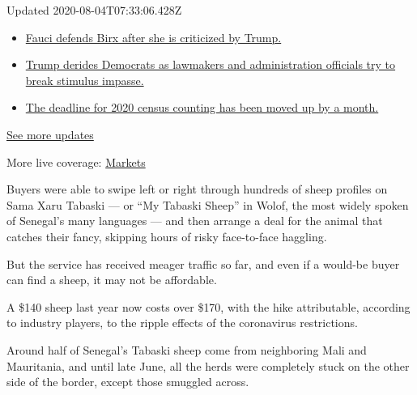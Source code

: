 Updated 2020-08-04T07:33:06.428Z

\begin{itemize}
\tightlist
\item
  \href{https://www.nytimes.com/2020/08/03/world/coronavirus-covid-19.html?action=click\&pgtype=Article\&state=default\&region=MAIN_CONTENT_1\&context=storylines_live_updates\#link-4547638f}{Fauci
  defends Birx after she is criticized by Trump.}
\item
  \href{https://www.nytimes.com/2020/08/03/world/coronavirus-covid-19.html?action=click\&pgtype=Article\&state=default\&region=MAIN_CONTENT_1\&context=storylines_live_updates\#link-15e7f995}{Trump
  derides Democrats as lawmakers and administration officials try to
  break stimulus impasse.}
\item
  \href{https://www.nytimes.com/2020/08/03/world/coronavirus-covid-19.html?action=click\&pgtype=Article\&state=default\&region=MAIN_CONTENT_1\&context=storylines_live_updates\#link-e5a2cda}{The
  deadline for 2020 census counting has been moved up by a month.}
\end{itemize}

\href{https://www.nytimes.com/2020/08/03/world/coronavirus-covid-19.html?action=click\&pgtype=Article\&state=default\&region=MAIN_CONTENT_1\&context=storylines_live_updates}{See
more updates}

More live coverage:
\href{https://www.nytimes.com/live/2020/08/03/business/stock-market-today-coronavirus?action=click\&pgtype=Article\&state=default\&region=MAIN_CONTENT_1\&context=storylines_live_updates}{Markets}

Buyers were able to swipe left or right through hundreds of sheep
profiles on Sama Xaru Tabaski --- or ``My Tabaski Sheep'' in Wolof, the
most widely spoken of Senegal's many languages --- and then arrange a
deal for the animal that catches their fancy, skipping hours of risky
face-to-face haggling.

But the service has received meager traffic so far, and even if a
would-be buyer can find a sheep, it may not be affordable.

A \$140 sheep last year now costs over \$170, with the hike
attributable, according to industry players, to the ripple effects of
the coronavirus restrictions.

Around half of Senegal's Tabaski sheep come from neighboring Mali and
Mauritania, and until late June, all the herds were completely stuck on
the other side of the border, except those smuggled across.

